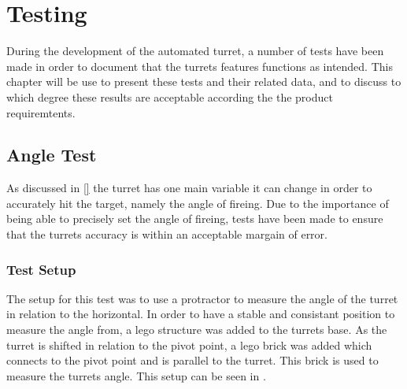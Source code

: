 \chapter{Testing}
During the development of the automated turret, a number of tests have been made
in order to document that the turrets features functions as intended. This
chapter will be use to present these tests and their related data, and to
discuss to which degree these results are acceptable according the the product
requiremtents.

\section{Angle Test}
As discussed in \autoref{} the turret has one main variable it can change in
order to accurately hit the target, namely the angle of fireing. Due to the
importance of being able to precisely set the angle of fireing, tests have been
made to ensure that the turrets accuracy is within an acceptable margain of
error.

\subsection{Test Setup}
The setup for this test was to use a protractor to measure the angle of the
turret in relation to the horizontal. In order to have a stable and
consistant position to measure the angle from, a lego structure was added to the
turrets base. As the turret is shifted in relation to the pivot point, a lego
brick was added which connects to the pivot point and is parallel to the turret.
This brick is used to measure the turrets angle. This setup can be seen in
.
